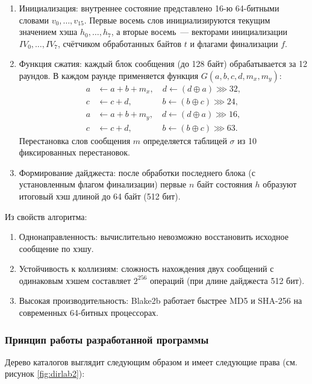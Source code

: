\documentclass[areasetadvanced]{scrartcl}
\begin{document}
\begin{enumerate}
    \item Инициализация: внутреннее состояние представлено 16-ю 64-битными словами $v_0, \ldots, v_{15}$. Первые восемь слов инициализируются текущим значением хэша $h_0, \ldots, h_7$, а вторые восемь~--- векторами инициализации $IV_0, \ldots, IV_7$, счётчиком обработанных байтов $t$ и флагами финализации $f$.
    
    \item Функция сжатия: каждый блок сообщения (до 128 байт) обрабатывается за 12 раундов. В каждом раунде применяется функция $G(a, b, c, d, m_x, m_y)$:
    \[
    \begin{aligned}
    a &\leftarrow a + b + m_x, \quad d \leftarrow (d \oplus a) \ggg 32, \\
    c &\leftarrow c + d, \quad\quad\quad\;\; b \leftarrow (b \oplus c) \ggg 24, \\
    a &\leftarrow a + b + m_y, \quad d \leftarrow (d \oplus a) \ggg 16, \\
    c &\leftarrow c + d, \quad\quad\quad\;\; b \leftarrow (b \oplus c) \ggg 63.
    \end{aligned}
    \]
    Перестановка слов сообщения $m$ определяется таблицей $\sigma$ из 10 фиксированных перестановок.
    
    \item Формирование дайджеста: после обработки последнего блока (с установленным флагом финализации) первые $n$ байт состояния $h$ образуют итоговый хэш длиной до 64 байт (512 бит).
\end{enumerate}

Из свойств алгоритма:
\begin{enumerate}
    \item Однонаправленность: вычислительно невозможно восстановить исходное сообщение по хэшу.
    \item Устойчивость к коллизиям: сложность нахождения двух сообщений с одинаковым хэшем составляет $2^{256}$ операций (при длине дайджеста 512 бит).
    \item Высокая производительность: Blake2b работает быстрее MD5 и SHA-256 на современных 64-битных процессорах.
\end{enumerate}

\subsubsection{Принцип работы разработанной программы}

Дерево каталогов выглядит следующим образом и имеет следующие права (см. рисунок \ref{fig:dirlab2}):
\end{document}
